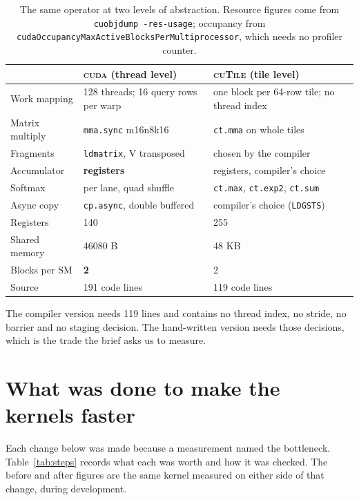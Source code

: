 \documentclass[10pt,a4paper]{article}
\newcommand{\cuda}{\textsc{cuda}}
\newcommand{\ctile}{\textsc{cuTile}}
\begin{document}
\begin{table}[H]
\centering\small
\caption{The same operator at two levels of abstraction. Resource figures come from
\texttt{cuobjdump -res-usage}; occupancy from \texttt{cudaOccupancyMaxActiveBlocksPerMultiprocessor},
which needs no profiler counter.}
\label{tab:impl}
\begin{tabular}{@{}lll@{}}
\toprule
 & \cuda{} (thread level) & \ctile{} (tile level) \\
\midrule
Work mapping & 128 threads; 16 query rows per warp & one block per 64-row tile; no thread index \\
Matrix multiply & \texttt{mma.sync} m16n8k16 & \texttt{ct.mma} on whole tiles \\
Fragments & \texttt{ldmatrix}, V transposed & chosen by the compiler \\
Accumulator & \textbf{registers} & registers, compiler's choice \\
Softmax & per lane, quad shuffle & \texttt{ct.max}, \texttt{ct.exp2}, \texttt{ct.sum} \\
Async copy & \texttt{cp.async}, double buffered & compiler's choice (\texttt{LDGSTS}) \\
Registers & 140 & 255 \\
Shared memory & 46080 B & 48 KB \\
Blocks per SM & \textbf{2} & 2 \\
Source & 191 code lines & 119 code lines \\
\bottomrule
\end{tabular}
\end{table}

The compiler version needs 119 lines and contains no thread index, no stride, no barrier and no staging
decision. The hand-written version needs those decisions, which is the trade the brief asks us to
measure.

\section{What was done to make the kernels faster}\label{sec:faster}

Each change below was made because a measurement named the bottleneck. Table~\ref{tab:steps} records
what each was worth and how it was checked. The before and after figures are the same kernel measured
on either side of that change, during development.
\end{document}
